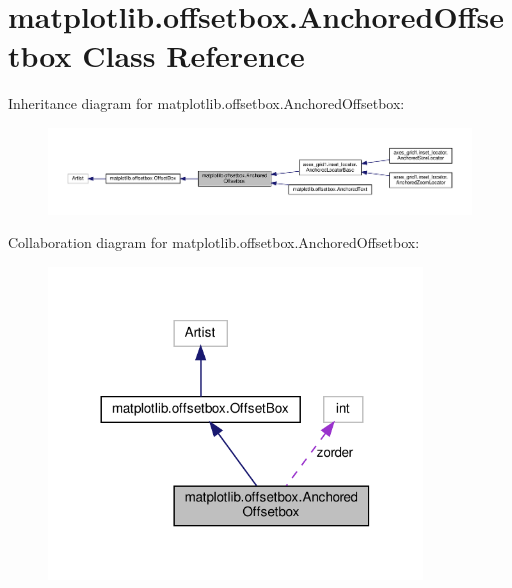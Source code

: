 \hypertarget{classmatplotlib_1_1offsetbox_1_1AnchoredOffsetbox}{}\section{matplotlib.\+offsetbox.\+Anchored\+Offsetbox Class Reference}
\label{classmatplotlib_1_1offsetbox_1_1AnchoredOffsetbox}


Inheritance diagram for matplotlib.\+offsetbox.\+Anchored\+Offsetbox\+:
\nopagebreak
\begin{figure}[H]
\begin{center}
\leavevmode
\includegraphics[width=350pt]{classmatplotlib_1_1offsetbox_1_1AnchoredOffsetbox__inherit__graph}
\end{center}
\end{figure}


Collaboration diagram for matplotlib.\+offsetbox.\+Anchored\+Offsetbox\+:
\nopagebreak
\begin{figure}[H]
\begin{center}
\leavevmode
\includegraphics[width=281pt]{classmatplotlib_1_1offsetbox_1_1AnchoredOffsetbox__coll__graph}
\end{center}
\end{figure}
